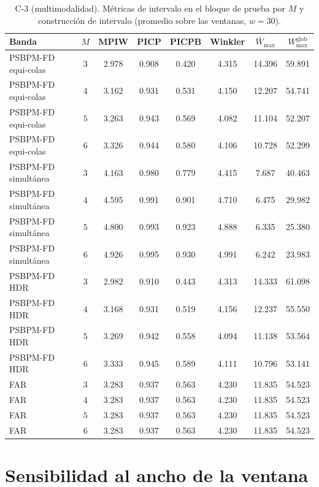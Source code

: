\begin{table}[H]
\centering\footnotesize
\caption{C-3 (multimodalidad). Métricas de intervalo en el bloque de prueba por $M$ y construcción de intervalo (promedio sobre las ventanas, $w = 30$).}
\label{tab:aneB_B_C3}
\begin{tabular}{l c cccccc}
\hline
 Banda & $M$ & MPIW & PICP & PICPB & Winkler & $\bar{W}_{\max}$ & $W_{\max}^{\mathrm{glob}}$ \\
\hline
PSBPM-FD equi-colas & $3$ & 2.978 & 0.908 & 0.420 & 4.315 & 14.396 & 59.891 \\
PSBPM-FD equi-colas & $4$ & 3.162 & 0.931 & 0.531 & 4.150 & 12.207 & 54.741 \\
PSBPM-FD equi-colas & $5$ & 3.263 & 0.943 & 0.569 & 4.082 & 11.104 & 52.207 \\
PSBPM-FD equi-colas & $6$ & 3.326 & 0.944 & 0.580 & 4.106 & 10.728 & 52.299 \\
\hline
PSBPM-FD simultánea & $3$ & 4.163 & 0.980 & 0.779 & 4.415 & 7.687 & 40.463 \\
PSBPM-FD simultánea & $4$ & 4.595 & 0.991 & 0.901 & 4.710 & 6.475 & 29.982 \\
PSBPM-FD simultánea & $5$ & 4.800 & 0.993 & 0.923 & 4.888 & 6.335 & 25.380 \\
PSBPM-FD simultánea & $6$ & 4.926 & 0.995 & 0.930 & 4.991 & 6.242 & 23.983 \\
\hline
PSBPM-FD HDR & $3$ & 2.982 & 0.910 & 0.443 & 4.313 & 14.333 & 61.098 \\
PSBPM-FD HDR & $4$ & 3.168 & 0.931 & 0.519 & 4.156 & 12.237 & 55.550 \\
PSBPM-FD HDR & $5$ & 3.269 & 0.942 & 0.558 & 4.094 & 11.138 & 53.564 \\
PSBPM-FD HDR & $6$ & 3.333 & 0.945 & 0.589 & 4.111 & 10.796 & 53.141 \\
\hline
FAR & $3$ & 3.283 & 0.937 & 0.563 & 4.230 & 11.835 & 54.523 \\
FAR & $4$ & 3.283 & 0.937 & 0.563 & 4.230 & 11.835 & 54.523 \\
FAR & $5$ & 3.283 & 0.937 & 0.563 & 4.230 & 11.835 & 54.523 \\
FAR & $6$ & 3.283 & 0.937 & 0.563 & 4.230 & 11.835 & 54.523 \\
\hline
\end{tabular}
\end{table}

\section{Sensibilidad al ancho de la ventana}
\label{aneB_00_02_sensibilidad_ventana}

